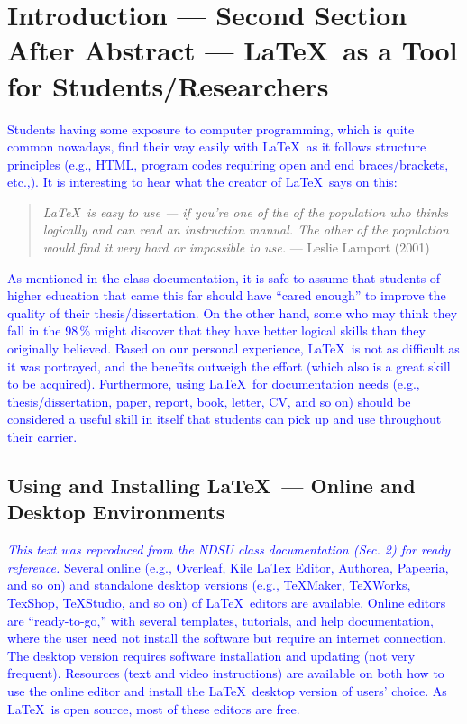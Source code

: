 \documentclass[phd]{ndsu-thesis-2022}
\newcommand\italk[1]{\textcolor{blue}{#1}}  %
\begin{document}
\vspace{-5ex}
\section{Introduction --- Second Section After Abstract --- \LaTeX\ as a Tool for Students/Researchers}
\italk{Students having some exposure to computer programming, which is quite common nowadays, find their way easily with \LaTeX\ as it follows structure principles (e.g., HTML, program codes requiring open and end braces/brackets, etc.,). It is interesting to hear what the creator of \LaTeX\ says on this:} 
\textcolor{magenta}{
\begin{quote}
\singlespacing
\raggedright
\textit{
\LaTeX\ is easy to use --- if you're one of the  of the population who thinks logically and can read an instruction manual. The other  of the population would find it very hard or impossible to use.} 
\hfill --- Leslie Lamport (2001)
\end{quote}
}

\italk{As mentioned in the class documentation, it is safe to assume that students of higher education that came this far should have ``cared enough'' to improve the quality of their thesis/dissertation. On the other hand, some who may think they fall in the 98\,\% might discover that they have better logical skills than they originally believed. Based on our personal experience, \LaTeX\ is not as difficult as it was portrayed, and the benefits outweigh the effort (which also is a great skill to be acquired). Furthermore, using \LaTeX\ for documentation needs (e.g., thesis/dissertation, paper, report, book, letter, CV, and so on) should be considered a useful skill in itself that students can pick up and use throughout their carrier. 
} 

\subsection{Using and Installing \LaTeX\  --- Online and Desktop Environments}  
\italk{\emph{This text was reproduced from the NDSU class documentation (Sec. 2) for ready reference.} Several online (e.g., Overleaf, Kile LaTex Editor, Authorea, Papeeria, and so on) and standalone desktop versions (e.g., TeXMaker, TeXWorks, TexShop, TeXStudio, and so on) of \LaTeX\ editors are available. Online editors are ``ready-to-go,'' with several templates, tutorials, and help documentation, where the user need not install the software but require an internet connection. The desktop version requires software installation and updating (not very frequent). Resources (text and video instructions) are available on both how to use the online editor and install the \LaTeX\ desktop version of users' choice. As \LaTeX\ is open source, most of these editors are free.}
\end{document}
